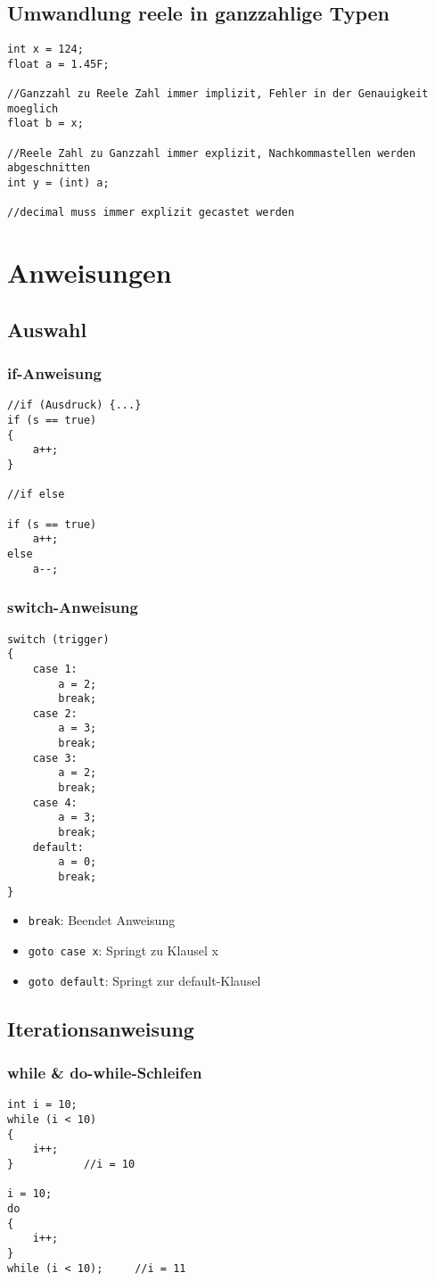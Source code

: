 \subsection{Umwandlung reele in ganzzahlige Typen}
\begin{lstlisting}
int x = 124;
float a = 1.45F;

//Ganzzahl zu Reele Zahl immer implizit, Fehler in der Genauigkeit moeglich
float b = x;

//Reele Zahl zu Ganzzahl immer explizit, Nachkommastellen werden abgeschnitten
int y = (int) a;

//decimal muss immer explizit gecastet werden
\end{lstlisting}
\section{Anweisungen}
\subsection{Auswahl}
\subsubsection{if-Anweisung}
\begin{lstlisting}
//if (Ausdruck) {...}
if (s == true)
{
	a++;
}

//if else

if (s == true)
	a++;
else
	a--;
\end{lstlisting}
\subsubsection{switch-Anweisung}
\begin{lstlisting}
switch (trigger)
{
	case 1:
		a = 2;
		break;
	case 2:
		a = 3;
		break;
	case 3:
		a = 2;
		break;
	case 4:
		a = 3;
		break;
	default:
		a = 0;
		break;
}
\end{lstlisting}
\begin{itemize}
\item \texttt{break}: Beendet Anweisung
\item \texttt{goto case x}: Springt zu Klausel x
\item \texttt{goto default}: Springt zur default-Klausel
\end{itemize}
\subsection{Iterationsanweisung}
\subsubsection{while \& do-while-Schleifen}
\begin{lstlisting}
int i = 10;
while (i < 10)
{
	i++;
}			//i = 10

i = 10;
do
{
	i++;
}
while (i < 10);		//i = 11
\end{lstlisting}
